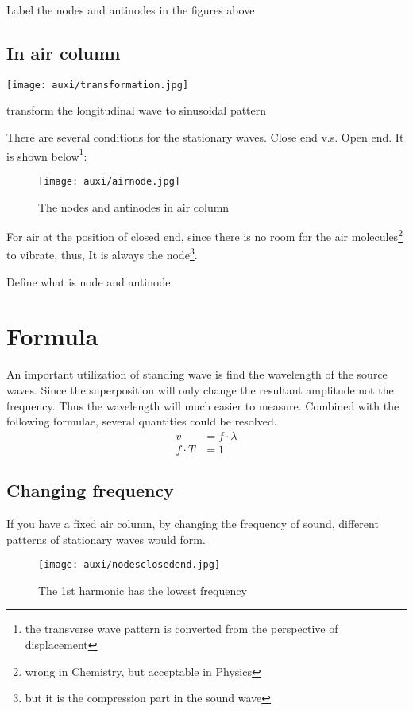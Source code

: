 \documentclass[a4paper]{tufte-handout}
\newenvironment{TaskBox} %
{\begin{tcolorbox}[breakable,colback=b1!30,colframe=b1,title=Task]} {\end{tcolorbox}}
\newenvironment{SummBox}
{\begin{tcolorbox}[breakable,colback=r1!30,colframe=r1,title=Summary]} {\end{tcolorbox}}
\begin{document}
\begin{TaskBox}
Label the nodes and antinodes in the figures above
\end{TaskBox}


\subsection{In air column}
\begin{marginfigure}[35cm]
\centering
\texttt{[image: auxi/transformation.jpg]}
\caption{transform the longitudinal wave to sinusoidal pattern}
\label{fig:transform l to t}
\end{marginfigure}

There are several conditions for the stationary waves. Close end v.s. Open end. It is shown below\footnote{the transverse wave pattern is converted from the perspective of displacement}:
\begin{figure}[h]
\centering
\texttt{[image: auxi/airnode.jpg]}
\caption{The nodes and antinodes in air column}
\label{fig:air nodes}
\end{figure}
For air at the position of closed end, since there is no room for the air molecules\footnote{wrong in Chemistry, but acceptable in Physics} to vibrate, thus, It is always the node\footnote{but it is the compression part in the sound wave}.

\begin{SummBox}
Define what is node and antinode
\vspace{2in}
\end{SummBox}

\section{Formula}
An important utilization of standing wave is find the wavelength of the source waves. Since the superposition will only change the resultant amplitude not the frequency. Thus the wavelength will much easier to measure. Combined with the following formulae, several quantities could be resolved. 
\begin{align*}
  v &= f\cdot \lambda\\
  f\cdot T &= 1
\end{align*}


\subsection{Changing frequency}
If you have a fixed air column, by changing the frequency of sound, different patterns of stationary waves would form.
\begin{figure}[h]
\centering
\texttt{[image: auxi/nodesclosedend.jpg]}
\caption{The 1st harmonic has the lowest frequency}
\end{figure}
\end{document}
